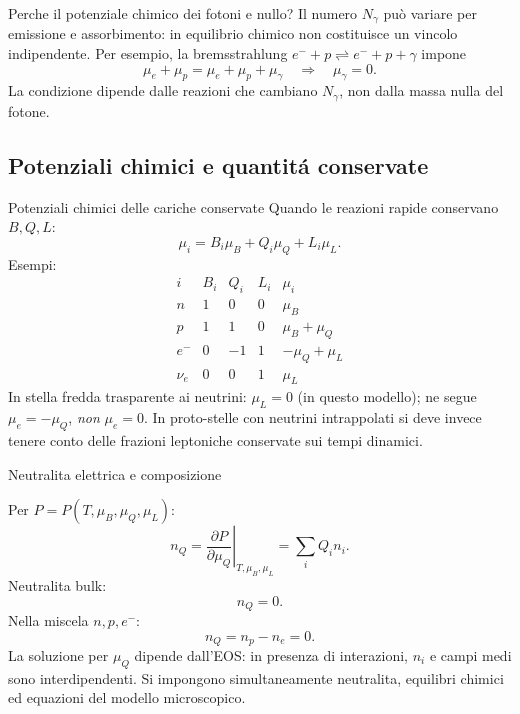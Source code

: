 \begin{frame}[t]{Perche il potenziale chimico dei fotoni e nullo?}
\vspace*{3mm}
\small
Il numero $N_\gamma$ può variare per emissione e assorbimento:
in equilibrio chimico non costituisce un vincolo indipendente.
Per esempio, la bremsstrahlung
$e^-+p\rightleftharpoons e^-+p+\gamma$ impone
\[
\mu_e+\mu_p=\mu_e+\mu_p+\mu_\gamma
\quad\Longrightarrow\quad
\boxed{\mu_\gamma=0}.
\]
La condizione dipende dalle reazioni che cambiano $N_\gamma$,
non dalla massa nulla del fotone.
\end{frame}

\subsection{Potenziali chimici e quantit\'a conservate}

\begin{frame}[t]{Potenziali chimici delle cariche conservate}
\vspace*{3mm}
\small
Quando le reazioni rapide conservano $B,Q,L$:
\[
\boxed{\mu_i=B_i\mu_B+Q_i\mu_Q+L_i\mu_L.}
\]
Esempi:
\[
\begin{array}{c|ccc|c}
 i&B_i&Q_i&L_i&\mu_i\\\hline
 n&1&0&0&\mu_B\\
 p&1&1&0&\mu_B+\mu_Q\\
 e^-&0&-1&1&-\mu_Q+\mu_L\\
 \nu_e&0&0&1&\mu_L
\end{array}
\]
In stella fredda trasparente ai neutrini: $\mu_L=0$ (in questo modello); ne segue $\mu_e=-\mu_Q$, \emph{non} $\mu_e=0$.
In proto-stelle con neutrini intrappolati si deve invece tenere conto delle frazioni leptoniche conservate sui tempi dinamici.
\end{frame}

\begin{frame}[t]{Neutralita elettrica e composizione}
\vspace*{3mm}
\small

Per $P=P(T,\mu_B,\mu_Q,\mu_L)$:
\[
n_Q=\left.\frac{\partial P}{\partial\mu_Q}\right|_{T,\mu_B,\mu_L}
=\sum_iQ_i n_i.
\]
Neutralita bulk:
\[
\boxed{n_Q=0.}
\]
Nella miscela $n,p,e^-$:
\[
n_Q=n_p-n_e=0.
\]
La soluzione per $\mu_Q$ dipende dall'EOS: in presenza di interazioni, $n_i$ e campi medi sono interdipendenti. Si impongono simultaneamente neutralita, equilibri chimici ed equazioni del modello microscopico.
\end{frame}

